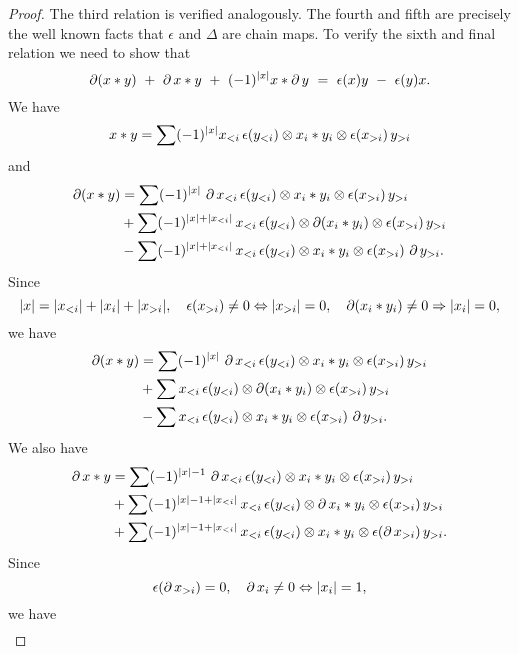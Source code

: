 \begin{proof}
	The third relation is verified analogously.
	The fourth and fifth are precisely the well known facts that $\epsilon$ and $\Delta$ are chain maps.
	To verify the sixth and final relation we need to show that
	\[
	\bd (x \ast y)\ +\ \bd x \ast y\ +\ (-1)^{|x|}x \ast \bd y\ =\ \epsilon(x) y \ -\ \epsilon(y) x.
	\]
	We have
	\[
	x \ast y = \sum (-1)^{|x|} x_{<i} \, \epsilon(y_{<i}) \otimes x_i \ast y_i \otimes \epsilon(x_{>i})\, y_{>i}
	\]
	and
	\begin{align*}
		\operatorname{\partial}(x \ast y) & =
		\sum (-1)^{|x|} \, \operatorname{\partial} x_{<i}\, \epsilon(y_{<i}) \otimes x_i \ast y_i \otimes \epsilon(x_{>i})\, y_{>i} \\ & +
		\sum (-1)^{|x|+|x_{<i}|} \, x_{<i}\, \epsilon(y_{<i}) \otimes \operatorname{\partial} (x_i \ast y_i) \otimes \epsilon(x_{>i}) \, y_{>i} \\ & -
		\sum (-1)^{|x|+|x_{<i}|} \, x_{<i}\, \epsilon(y_{<i}) \otimes x_i \ast y_i \otimes \epsilon(x_{>i})\, \operatorname{\partial} y_{>i}.
	\end{align*}
	Since
	\[
	|x| = |x_{<i}| + |x_i| + |x_{>i}|, \quad \epsilon(x_{>i}) \neq 0 \Leftrightarrow |x_{>i}| = 0, \quad \operatorname{\partial}(x_i \ast y_i) \neq 0 \Rightarrow |x_i| = 0,
	\]
	we have
	\begin{equation} \label{e:boundary of product 1}
		\begin{split}
			\operatorname{\partial}(x \ast y) & =
			\sum (-1)^{|x|} \, \operatorname{\partial} x_{<i}\, \epsilon(y_{<i}) \otimes x_i \ast y_i \otimes \epsilon(x_{>i})\, y_{>i} \\ & +
			\sum x_{<i} \, \epsilon(y_{<i}) \otimes \operatorname{\partial} (x_i \ast y_i) \otimes \epsilon(x_{>i})\, y_{>i} \\ & -
			\sum x_{<i} \, \epsilon(y_{<i}) \otimes x_i \ast y_i \otimes \epsilon(x_{>i})\, \operatorname{\partial} y_{>i}.
		\end{split}
	\end{equation}
	We also have
	\begin{align*}
		\operatorname{\partial} x \ast y & =
		\sum (-1)^{|x|-1} \, \operatorname{\partial} x_{<i}\, \epsilon(y_{<i}) \otimes x_i \ast y_i \otimes \epsilon(x_{>i}) \, y_{>i} \\ & +
		\sum (-1)^{|x|-1+|x_{<i}|} \, x_{<i}\, \epsilon(y_{<i}) \otimes \operatorname{\partial} x_i \ast y_i \otimes \epsilon(x_{>i}) \, y_{>i} \\ & +
		\sum (-1)^{|x|-1+|x_{<i}|} \, x_{<i}\, \epsilon(y_{<i}) \otimes x_i \ast y_i \otimes \epsilon(\operatorname{\partial} x_{>i}) \, y_{>i}.
	\end{align*}
	Since
	\[
	\epsilon(\operatorname{\partial} x_{>i}) = 0, \quad \operatorname{\partial} x_i \neq 0 \Leftrightarrow |x_i| = 1,
	\]
	we have
	\begin{equation} \label{e:boundary of product 2}
		\begin{split}

\end{split}
\end{equation}
\end{proof}
